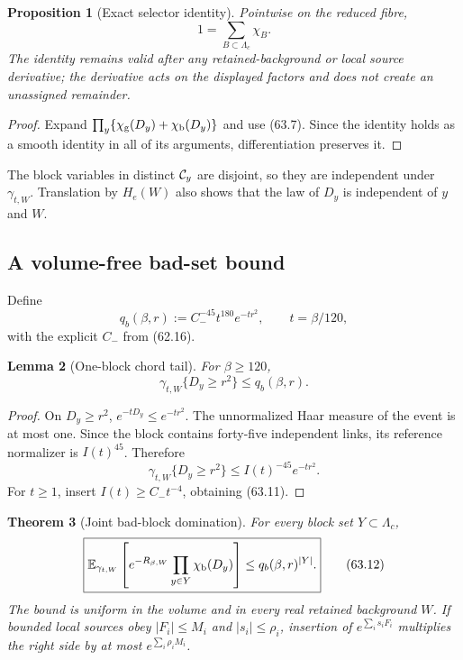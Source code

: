 \documentclass[11pt,oneside]{book}
\newtheorem{theorem}{Theorem}[chapter]
\newtheorem{lemma}[theorem]{Lemma}
\newtheorem{proposition}[theorem]{Proposition}
\theoremstyle{definition}
\theoremstyle{remark}
\begin{document}
\begin{proposition}[Exact selector identity]
\label{prop:e8v63-selector}
Pointwise on the reduced fibre,
\[
                         1=\sum_{B\subset\Lambda_c}\chi_B.  \tag{63.9}
\]
The identity remains valid after any retained-background or local
source derivative; the derivative acts on the displayed factors and
does not create an unassigned remainder.
\end{proposition}

\begin{proof}
Expand
\(\prod_y\{\chi_{\rm g}(D_y)+\chi_{\rm b}(D_y)\}\) and use
(63.7).  Since the identity holds as a smooth identity in all of its
arguments, differentiation preserves it.
\end{proof}

The block variables in distinct \({\cal C}_y\) are disjoint, so
they are independent under \(\gamma_{t,W}\).  Translation by
\(H_e(W)\) also shows that the law of \(D_y\) is independent of
\(y\) and \(W\).

\subsection{A volume-free bad-set bound}

Define
\[
 q_b(\beta,r):=
 C_-^{-45}t^{180}e^{-tr^2},
 \qquad t=\beta/120,                                        \tag{63.10}
\]
with the explicit \(C_-\) from (62.16).

\begin{lemma}[One-block chord tail]
\label{lem:e8v63-chord-tail}
For \(\beta\ge120\),
\[
 \gamma_{t,W}\{D_y\ge r^2\}
 \le q_b(\beta,r).                                          \tag{63.11}
\]
\end{lemma}

\begin{proof}
On \(D_y\ge r^2\),
\(e^{-tD_y}\le e^{-tr^2}\).  The unnormalized Haar measure of the
event is at most one.  Since the block contains forty-five
independent links, its reference normalizer is \(I(t)^{45}\).
Therefore
\[
 \gamma_{t,W}\{D_y\ge r^2\}
 \le I(t)^{-45}e^{-tr^2}.
\]
For \(t\ge1\), insert \(I(t)\ge C_-t^{-4}\), obtaining (63.11).
\end{proof}

\begin{theorem}[Joint bad-block domination]
\label{thm:e8v63-joint-bad}
For every block set \(Y\subset\Lambda_c\),
\[
\boxed{
 \mathbb E_{\gamma_{t,W}}
 \left[e^{-R_{\beta,W}}
       \prod_{y\in Y}\chi_{\rm b}(D_y)\right]
 \le q_b(\beta,r)^{|Y|}.}                                   \tag{63.12}
\]
The bound is uniform in the volume and in every real retained
background \(W\).  If bounded local sources obey
\(|F_i|\le M_i\) and \(|s_i|\le\rho_i\), insertion of
\(e^{\sum_i s_iF_i}\) multiplies the right side by at most
\(e^{\sum_i\rho_iM_i}\).
\end{theorem}
\end{document}
